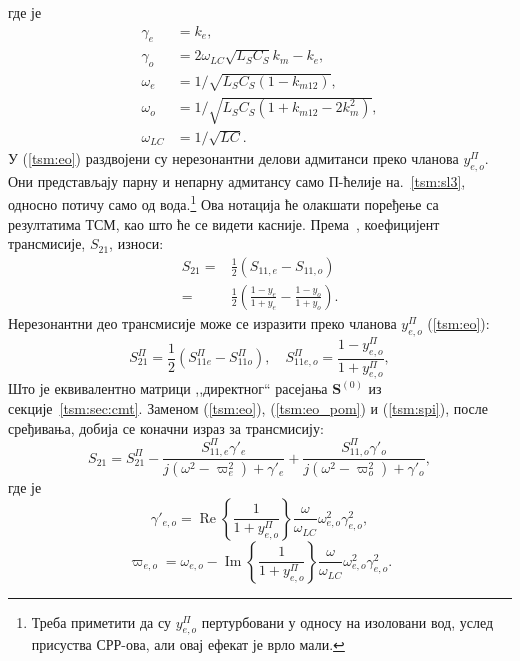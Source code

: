 \documentclass[main.tex]{subfiles}
\begin{document}
где је
\begin{equation}
\begin{aligned}
\gamma_e &= k_e, \\
\gamma_o &= 2\omega_{LC}\sqrt{L_S C_S} k_m - k_e, \\
\omega_e &= 1/ \sqrt{L_S C_S(1-k_{m12})}, \\
\omega_o &= 1/ \sqrt{L_S C_S(1+k_{m12}-2k_m^2)}, \\
\omega_{LC} &= 1/ \sqrt{LC}.
\end{aligned}
\label{tsm:eo_pom}
\end{equation}
У (\ref{tsm:eo}) раздвојени су нерезонантни делови адмитанси преко чланова $y_{e,o}^\Pi$. Они представљају парну  и непарну адмитансу само П-ћелије на.~\ref{tsm:sl3}, односно потичу само од вода.\footnote{Треба приметити да су $y_{e,o}^\Pi$ пертурбовани у односу на изоловани вод, услед присуства СРР-ова, али овај ефекат је врло мали.} Ова нотација ће олакшати поређење са резултатима ТСМ, као што ће се видети касније. Према~\cite{hong}, коефицијент трансмисије, $S_{21}$, износи:
\begin{equation}
\begin{aligned}
S_{21} =& \frac{1}{2}(S_{11,e}-S_{11,o}) \\
=& \frac{1}{2}\left( \frac{1-y_e}{1+y_e}
- \frac{1-y_o}{1+y_o} \right).
\end{aligned}
\end{equation}
Нерезонантни део трансмисије може се изразити преко чланова $y_{e,o}^\Pi$ (\ref{tsm:eo}):
\begin{equation}
S_{21}^\Pi = \frac{1}{2} \left( S_{11e}^\Pi - S_{11o}^\Pi \right),\quad
S_{11e,o}^\Pi = \frac{1-y_{e,o}^\Pi}{1+y_{e,o}^\Pi},
\label{tsm:spi}\end{equation}
Што је еквивалентно матрици ,,директног`` расејања $\mathbf{S}^{(0)}$ из секције~\ref{tsm:sec:cmt}. Заменом (\ref{tsm:eo}), (\ref{tsm:eo_pom}) и (\ref{tsm:spi}), после сређивања, добија се коначни израз за трансмисију:
\begin{equation}
S_{21} = S_{21}^\Pi - \frac{S_{11,e}^\Pi\gamma'_e}{j(\omega^2-\varpi_e^2)+\gamma'_e} + \frac{S_{11,o}^\Pi\gamma'_o}{j(\omega^2-\varpi_o^2)+\gamma'_o},
\label{tsm:s21sm}\end{equation}
где је
\begin{equation}
\gamma'_{e,o} = \operatorname{Re}\left\{ \frac{1}{1+y_{e,o}^\Pi} \right\} \frac{\omega}{\omega_{LC}}\omega_{e,o}^2\gamma_{e,o}^2,
\label{tsm:gama}\end{equation}
\begin{equation}
\varpi_{e,o} = \omega_{e,o} - \operatorname{Im}\left\{ \frac{1}{1+y_{e,o}^\Pi} \right\} \frac{\omega}{\omega_{LC}}\omega_{e,o}^2\gamma_{e,o}^2.
\label{tsm:omega}\end{equation}
\end{document}

